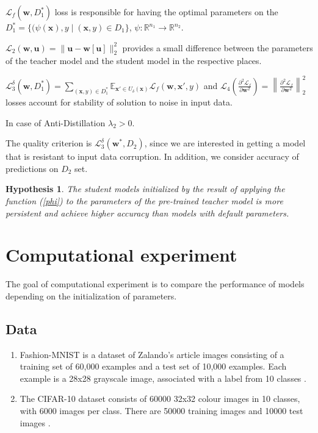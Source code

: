 \documentclass[80pt]{article}
\begin{document}
$\mathcal{L}_f(\mathbf{w}, D_1^*)$ loss is responsible for having the optimal parameters on the $D_1^* = \{(\psi (\textbf{x}), y \;|\; (\textbf{x}, y) \in D_1\}$, $\psi: \mathbb{R}^{n_1} \rightarrow \mathbb{R}^{n_2}$. 

$\mathcal{L}_2 (\mathbf{w}, \mathbf{u}) = \|\textbf{u} - \textbf{w}[\textbf{u}]\|^2_2$ provides a small difference between the parameters of the teacher model and the student model in the respective places. 

$\mathcal{L}_3^\delta (\mathbf{w}, D_1^*) = \displaystyle \sum \limits_{(\textbf{x}, y) \in D_1^*} \displaystyle \mathbb{E}_{\textbf{x}' \in U_\delta(\textbf{x})} \mathcal{L}_f(\mathbf{w}, \textbf{x}', y)$  and  $\mathcal{L}_4 \left(\displaystyle \frac{\partial^2 \mathcal{L}_f}{\partial \mathbf{w}^2}\right) = \left\lVert \displaystyle \frac{\partial^2 \mathcal{L}_f}{\partial \mathbf{w}^2} \right\rVert^2_2$ losses account for stability of solution to noise in input data.

In case of Anti-Distillation $\lambda_2 >0$. 

The quality criterion is $\mathcal{L}_3^\delta (\mathbf{w}^*, D_2)$, since we are interested in getting a model that is resistant to input data corruption. In addition, we consider accuracy of predictions on $D_2$ set.

\newtheorem{hypothesis}{Hypothesis}
\begin{hypothesis}
The student models initialized by the result of applying the function (\ref{phi}) to the parameters of the pre-trained teacher model is more persistent and achieve higher accuracy than models with default parameters.
\end{hypothesis}

\section{Computational experiment}

The goal of computational experiment is to compare the performance of models depending on the initialization of parameters. 

\subsection{Data}

\begin{enumerate}
    \item Fashion-MNIST is a dataset of Zalando's article images consisting of a training set of 60,000 examples and a test set of 10,000 examples. Each example is a 28x28 grayscale image, associated with a label from 10 classes  \citep{fashionmnist}.
    
    \item The CIFAR-10 dataset consists of 60000 32x32 colour images in 10 classes, with 6000 images per class. There are 50000 training images and 10000 test images \citep{cifar10}.
\end{enumerate}
\end{document}
